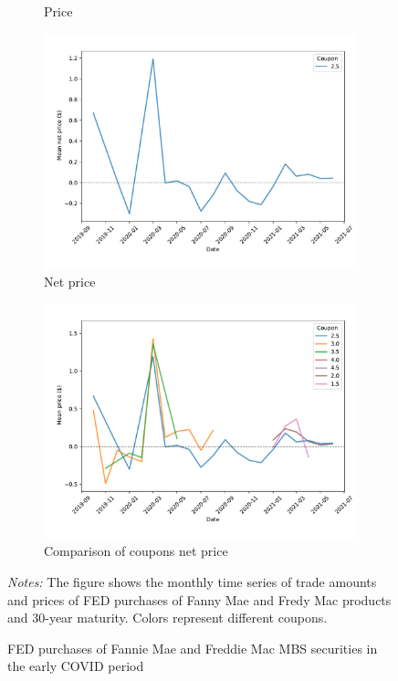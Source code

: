 \documentclass[11pt,a4paper]{article}
\begin{document}
\begin{figure}[h]
\begin{subfigure}[b]{0.49\textwidth}
    \caption{ Price }
   \end{subfigure}
   \begin{subfigure}[b]{0.49\textwidth}
    \includegraphics[width=0.998\textwidth]{../results/figures/fed_price_mean_mat30_loan1_timeseries_cpmonthly_normalized_coup2.5}
    \caption{ Net price}
   \end{subfigure}
   \begin{subfigure}[b]{0.49\textwidth}
    \includegraphics[width=0.998\textwidth]{../results/figures/fed_price_mean_mat30_loan1_timeseries_cpmonthly_.pdf}
    \caption{ Comparison of coupons net price }
   \end{subfigure}
   \caption{FED purchases of Fannie Mae and Freddie Mac MBS securities  in the early COVID period} 
   \begin{minipage}{\textwidth}
      \footnotesize{\textit{Notes:} The figure shows the monthly time series of trade amounts and prices of FED purchases of Fanny Mae and Fredy Mac products and 30-year maturity. Colors represent different coupons. } 
      \end{minipage}
\end{figure}
\end{document}
